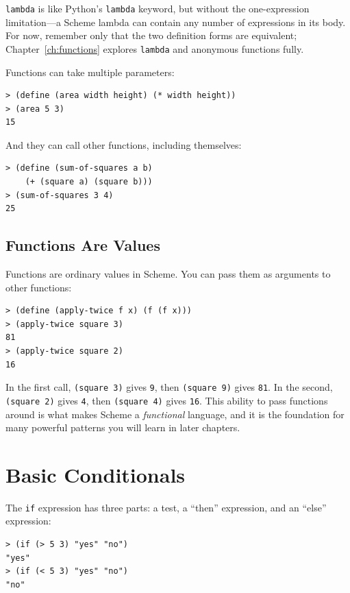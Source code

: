 \texttt{lambda} is like Python's \texttt{lambda} keyword, but without the one-expression limitation---a Scheme lambda can contain any number of expressions in its body. For now, remember only that the two definition forms are equivalent; Chapter~\ref{ch:functions} explores \texttt{lambda} and anonymous functions fully.

Functions can take multiple parameters:

\begin{lstlisting}[style=repl]
> (define (area width height) (* width height))
> (area 5 3)
15
\end{lstlisting}

And they can call other functions, including themselves:

\begin{lstlisting}[style=repl]
> (define (sum-of-squares a b)
    (+ (square a) (square b)))
> (sum-of-squares 3 4)
25
\end{lstlisting}

\subsection{Functions Are Values}

Functions are ordinary values in Scheme. You can pass them as arguments to other functions:

\begin{lstlisting}[style=repl]
> (define (apply-twice f x) (f (f x)))
> (apply-twice square 3)
81
> (apply-twice square 2)
16
\end{lstlisting}

In the first call, \texttt{(square 3)} gives \texttt{9}, then \texttt{(square 9)} gives \texttt{81}. In the second, \texttt{(square 2)} gives \texttt{4}, then \texttt{(square 4)} gives \texttt{16}. This ability to pass functions around is what makes Scheme a \emph{functional} language, and it is the foundation for many powerful patterns you will learn in later chapters.

\section{Basic Conditionals}

The \texttt{if} expression has three parts: a test, a ``then'' expression, and an ``else'' expression:

\begin{lstlisting}[style=repl]
> (if (> 5 3) "yes" "no")
"yes"
> (if (< 5 3) "yes" "no")
"no"
\end{lstlisting}

